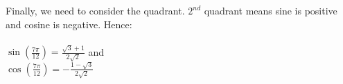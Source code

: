 \noindent Finally, we need to consider the quadrant. $2^{nd}$ quadrant means
sine is positive and cosine is negative. Hence: \\
\\
\Large{$\sin\left(\frac{7\pi}{12}\right) = \frac{\sqrt{3} +1}{2\sqrt{2}}$ } and \\
\Large{$\cos\left(\frac{7\pi}{12}\right) = - \frac{1 - \sqrt{3}}{2\sqrt{2}}$} \qedbitches \\

